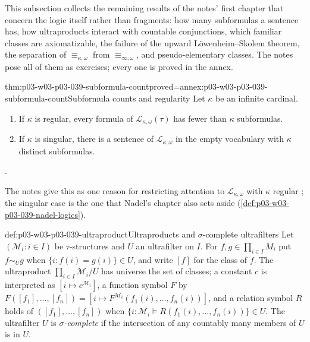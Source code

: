 This subsection collects the remaining results of the notes' first chapter
that concern the logic itself rather than fragments: how many subformulas a
sentence has, how ultraproducts interact with countable conjunctions, which
familiar classes are axiomatizable, the failure of the upward
L\"owenheim--Skolem theorem, the separation of \(\equiv_{\kappa,\omega}\) from
\(\equiv_{\infty,\omega}\), and pseudo-elementary classes. The notes pose all of
them as exercises; every one is proved in the annex.

\begin{hbtheorem}{thm:p03-w03-p03-039-subformula-count}{proved=annex:p03-w03-p03-039-subformula-count}{Subformula counts and regularity}
Let \(\kappa\) be an infinite cardinal.
\begin{enumerate}
\item If \(\kappa\) is regular, every formula of \(\mathcal L_{\kappa,\omega}(\tau)\)
      has fewer than \(\kappa\) subformulas.
\item If \(\kappa\) is singular, there is a sentence of
      \(\mathcal L_{\kappa,\omega}\) in the empty vocabulary with \(\kappa\)
      distinct subformulas.
\end{enumerate}
\cite[Ex.~1.2, p.~5]{Marker2014InfinitaryNotes}.
\end{hbtheorem}

The notes give this as one reason for restricting attention to
\(\mathcal L_{\kappa,\omega}\) with \(\kappa\) regular
\cite[Ex.~1.2, p.~5]{Marker2014InfinitaryNotes}; the singular case is the one
that Nadel's chapter also sets aside (\cref{def:p03-w03-p03-039-nadel-logics}).

\begin{hbdefinition}{def:p03-w03-p03-039-ultraproduct}{Ultraproducts and \(\sigma\)-complete ultrafilters}
Let \((\mathcal M_i:i\in I)\) be \(\tau\)-structures and \(U\) an ultrafilter
on \(I\). For \(f,g\in\prod_{i\in I}M_i\) put \(f\sim_U g\) when
\(\{i:f(i)=g(i)\}\in U\), and write \([f]\) for the class of \(f\). The
ultraproduct \(\prod_{i\in I}\mathcal M_i/U\) has universe the set of classes;
a constant \(c\) is interpreted as \([i\mapsto c^{\mathcal M_i}]\), a function
symbol \(F\) by
\(F([f_1],\dots,[f_n])=[i\mapsto F^{\mathcal M_i}(f_1(i),\dots,f_n(i))]\), and
a relation symbol \(R\) holds of \(([f_1],\dots,[f_n])\) when
\(\{i:\mathcal M_i\models R(f_1(i),\dots,f_n(i))\}\in U\). The ultrafilter
\(U\) is \emph{\(\sigma\)-complete} if the intersection of any countably many
members of \(U\) is in \(U\).
\end{hbdefinition}

